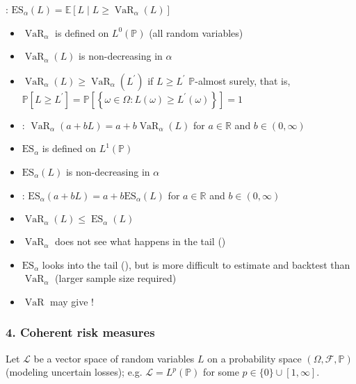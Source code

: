 : $\mathrm{ES}_{\alpha}(L)=\mathbb{E}\left[L \mid L \geq \operatorname{VaR}_{\alpha}(L)\right]$
\begin{itemize}[leftmargin=*]
    \item $\operatorname{VaR}_{\alpha}$ is defined on $L^{0}(\mathbb{P})$ (all random variables)
    \item $\operatorname{VaR}_{\alpha}(L)$ is non-decreasing in $\alpha$
    \item $\operatorname{VaR}_{\alpha}(L) \geq \operatorname{VaR}_{\alpha}\left(L^{\prime}\right)$ if $L \geq L^{\prime}$ $\mathbb{P}$-almost surely, that is, $\mathbb{P}\left[L \geq L^{\prime}\right]=\mathbb{P}\left[\left\{\omega \in \Omega: L(\omega) \geq L^{\prime}(\omega)\right\}\right]=1$
    \item {}: $\operatorname{VaR}_{\alpha}(a+b L)=a+b \operatorname{VaR}_{\alpha}(L)$ for $a \in \mathbb{R}$ and $b \in(0, \infty)$
    \item $\mathrm{ES}_{\alpha}$ is defined on $L^{1}(\mathbb{P})$
    \item $\mathrm{ES}_{\alpha}(L)$ is non-decreasing in $\alpha$
    \item {}: $\mathrm{ES}_{\alpha}(a+b L)=a+b \mathrm{ES}_{\alpha}(L)$ for $a \in \mathbb{R}$ and $b \in(0, \infty)$
    \item $\operatorname{VaR}_{\alpha}(L) \leq \operatorname{ES}_{\alpha}(L)$
    \item $\operatorname{VaR}_{\alpha}$ does not see what happens in the tail ()
    \item $\mathrm{ES}_{\alpha}$ looks into the tail (), but is more difficult to estimate and backtest than $\operatorname{VaR}_{\alpha}$ (larger sample size required)
    \item $\operatorname{VaR}$ may give !
\end{itemize}









\subsubsection*{4. Coherent risk measures}
Let $\mathcal{L}$ be a vector space of random variables $L$ on a probability space $(\Omega, \mathcal{F}, \mathbb{P})$ (modeling uncertain losses); e.g. $\mathcal{L}=L^{p}(\mathbb{P})$ for some $p \in\{0\} \cup[1, \infty]$.


